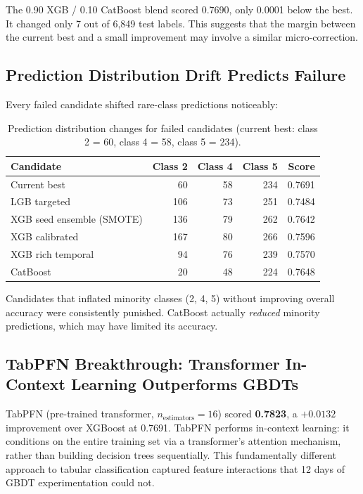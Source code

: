 \documentclass[12pt, a4paper]{article}
\begin{document}
The 0.90 XGB / 0.10 CatBoost blend scored 0.7690, only 0.0001 below the best. It changed only 7 out of 6{,}849 test labels. This suggests that the margin between the current best and a small improvement may involve a similar micro-correction.

\subsection{Prediction Distribution Drift Predicts Failure}

Every failed candidate shifted rare-class predictions noticeably:

\begin{table}[h]
\centering
\caption{Prediction distribution changes for failed candidates (current best: class 2 = 60, class 4 = 58, class 5 = 234).}
\label{tab:distribution_drift}
\begin{tabular}{@{}lrrrr@{}}
\toprule
\textbf{Candidate} & \textbf{Class 2} & \textbf{Class 4} & \textbf{Class 5} & \textbf{Score} \\ \midrule
Current best & 60 & 58 & 234 & 0.7691 \\
LGB targeted & 106 & 73 & 251 & 0.7484 \\
XGB seed ensemble (SMOTE) & 136 & 79 & 262 & 0.7642 \\
XGB calibrated & 167 & 80 & 266 & 0.7596 \\
XGB rich temporal & 94 & 76 & 239 & 0.7570 \\
CatBoost & 20 & 48 & 224 & 0.7648 \\ \bottomrule
\end{tabular}
\end{table}

Candidates that inflated minority classes (2, 4, 5) without improving overall accuracy were consistently punished. CatBoost actually \textit{reduced} minority predictions, which may have limited its accuracy.

\subsection{TabPFN Breakthrough: Transformer In-Context Learning Outperforms GBDTs}

TabPFN (pre-trained transformer, $n_{\text{estimators}}=16$) scored \textbf{0.7823}, a $+0.0132$ improvement over XGBoost at 0.7691. TabPFN performs in-context learning: it conditions on the entire training set via a transformer's attention mechanism, rather than building decision trees sequentially. This fundamentally different approach to tabular classification captured feature interactions that 12 days of GBDT experimentation could not.
\end{document}
